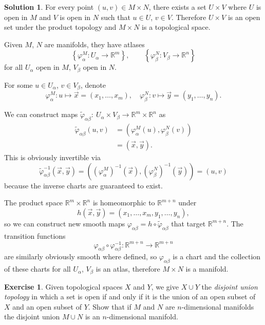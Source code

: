 \documentclass[11pt, a4paper]{article}
\theoremstyle{definition}
\newtheorem{ex}{Exercise}[part]
\newtheorem{sol}{Solution}[part]
\begin{document}
\begin{sol}

For every point $(u, v) \in M \times N$, there exists a set $U \times V$ where $U$ is open in $M$ and $V$ is open in $N$ such that $u \in U$, $v \in V$.
Therefore $U \times V$ is an open set under the product topology and $M \times N$ is a topological space.

Given $M$, $N$ are manifolds, they have atlases
\[
    \left\{\varphi^M_\alpha: U_\alpha \to \mathbb{R}^m \right\}, \qquad
    \left\{\varphi^N_\beta: V_\beta \to \mathbb{R}^n \right\}
\]
for all $U_\alpha$ open in $M$, $V_\beta$ open in $N$.

For some $u \in U_\alpha$, $v \in V_\beta$, denote
\[
    \varphi^M_\alpha: u \mapsto \vec{x} = (x_1, \ldots, x_m), \quad
    \varphi^N_\beta: v \mapsto \vec{y} = (y_1, \ldots, y_n).
\]

We can construct maps $\tilde{\varphi}_{\alpha\beta}:\ U_\alpha \times V_\beta \to \mathbb{R}^m \times \mathbb{R}^n$ as
\begin{align*}
    \tilde{\varphi}_{\alpha\beta} (u, v) &= \left(\varphi^M_\alpha(u), \varphi^N_\beta(v)\right) \\
        &= (\vec{x}, \vec{y}).
\end{align*}
This is obviously invertible via
\[
    \tilde{\varphi}_{\alpha\beta}^{-1}(\vec{x}, \vec{y}) = \left({(\varphi^M_\alpha)}^{-1}(\vec{x}), {(\varphi^N_\beta)}^{-1}(\vec{y})\right) = (u, v)
\]
because the inverse charts are guaranteed to exist.

The product space $\mathbb{R}^m \times \mathbb{R}^n$ is homeomorphic to $\mathbb{R}^{m + n}$ under
\[
    h(\vec{x}, \vec{y}) = (x_1, \ldots, x_m, y_1, \ldots, y_n),
\]
so we can construct new smooth maps $\varphi_{\alpha\beta} = h \circ \tilde{\varphi}_{\alpha\beta}$ that target $\mathbb{R}^{m + n}$.
The transition functions
\[
    \varphi_{\alpha\beta} \circ \varphi_{\alpha\beta}^{-1}: \mathbb{R}^{m + n} \to \mathbb{R}^{m + n}
\]
are similarly obviously smooth where defined, so $\varphi_{\alpha\beta}$ is a chart and the collection of these charts for all $U_\alpha$, $V_\beta$ is an atlas, therefore $M \times N$ is a manifold.

\end{sol}

\begin{ex}

Given topological spaces $X$ and $Y$, we give $X \cup Y$ the \emph{disjoint union topology} in which a set is open if and only if it is the union of an open subset of $X$ and an open subset of $Y$.
Show that if $M$ and $N$ are $n$-dimensional manifolds the disjoint union $M \cup N$ is an $n$-dimensional manifold.

\end{ex}
\end{document}
